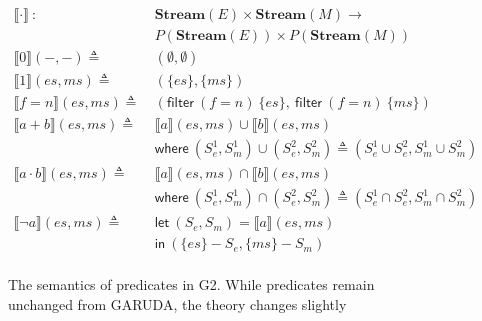 \documentclass[sigconf,usenames,dvipsnames,svgnames,table]{acmart}
\newcommand{\interp}[1]{\llbracket #1 \rrbracket}
\def \sysname {\textsc{G2}\xspace}
\def \oldname {\textsc{GARUDA}\xspace}
\begin{document}
        \begin{figure}
          \centering
          \begin{align*}
            \interp{ \cdot }\ 
              :\ \ &
              \mathbf{Stream}(E)\times \mathbf{Stream}(M) \rightarrow \\
              & P(\mathbf{Stream}(E))\times P(\mathbf{Stream}(M)) 
              \\
            \interp{ 0 }(-, -)
              \triangleq\ &
              (\emptyset , \emptyset)
              \\ %
            \interp{ 1 }(es, ms)
              \triangleq\ &
              (\{es\},\{ms\})
              \\
            \interp{ f=n }(es, ms)
              \triangleq\ &
              (\mathsf{filter}\ (f=n)\ \{es\},\
               \mathsf{filter}\ (f=n)\ \{ms\}) 
              \\
            \interp{ a + b }(es, ms)
              \triangleq\ &
              \interp { a }(es, ms)\cup
              \interp { b }(es, ms) \\
              &\mathsf{where}\ (S_e^1, S_m^1)\cup (S_e^2, S_m^2)\triangleq
                (S_e^1\cup S_e^2, S_m^1\cup S_m^2)\\
            \interp { a \cdot b }(es, ms)
              \triangleq\ &
              \interp { a }(es, ms)\cap
              \interp { b }(es, ms) \\
              &\mathsf{where}\ (S_e^1, S_m^1)\cap (S_e^2, S_m^2)\triangleq
                (S_e^1\cap S_e^2, S_m^1\cap S_m^2)\\
            \interp { \neg a }(es, ms)
              \triangleq\ &
              \mathsf{let}\ (S_e, S_m) = \interp {a}(es, ms) \\
              &\mathsf{in}\ (\{es\} - S_e, \{ms\} - S_m)
              \\
          \end{align*}
          \caption{The semantics of predicates in \sysname.  While predicates remain unchanged from \oldname, the theory changes slightly}
          \label{fig:garuda:sem:pol}
        \end{figure}

\end{document}
